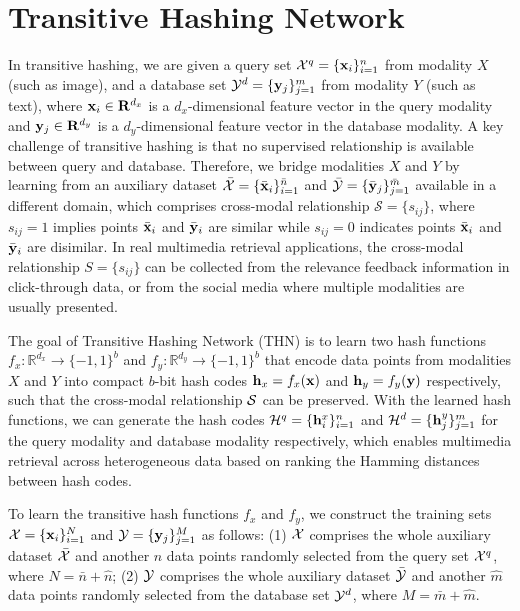 \documentclass{article}
\begin{document}
\section{Transitive Hashing Network}
In transitive hashing, we are given a query set ${\cal X}^q = \{ {\bf x}_i\}_{i=1}^n$ from modality $X$ (such as image), and a database set ${\cal Y}^d = \{ {\bf y}_j\}_{j=1}^m$ from modality $Y$ (such as text), where ${\bf x}_i \in \mathcal{\bf{R}}^{d_x}$ is a $d_x$-dimensional feature vector in the query modality and ${\bf y}_j \in \mathcal{\bf{R}}^{d_y}$ is a $d_y$-dimensional feature vector in the database modality. A key challenge of transitive hashing is that no supervised relationship  is available between query and database. Therefore, we bridge modalities $X$ and $Y$ by learning from an auxiliary dataset ${\cal\bar{X}} = \{ {\bar{\bf x}}_i\}_{i=1}^{\bar n}$ and ${\cal\bar{Y}} = \{ {\bar{\bf y}}_j\}_{j=1}^{\bar m}$ available in a different domain, which comprises cross-modal relationship $\mathcal{S} = \{ s_{ij}\}$, where $s_{ij} = 1$ implies points ${\bar{\bf x}}_i$ and ${\bar{\bf y}}_i$ are similar while $s_{ij} = 0$ indicates points ${\bar{\bf x}}_i$ and ${\bar{\bf y}}_i$ are disimilar. In real multimedia retrieval applications, the cross-modal relationship $S=\{s_{ij}\}$ can be collected from the relevance feedback information in click-through data, or from the social media where multiple modalities are usually presented.

The goal of Transitive Hashing Network (THN) is to learn two hash functions $f_x :\mathbb{R}^{d_x} \to \{ -1,1\}^b$ and $f_y :\mathbb{R}^{d_y} \to \{ -1,1 \}^b$ that encode data points from modalities $X$ and $Y$ into compact $b$-bit hash codes ${\bf h}_x = f_x({\bf x})$ and ${\bf h}_y = f_y({\bf y})$ respectively, such that the cross-modal relationship ${\cal S}$ can be preserved. With the learned hash functions, we can generate the hash codes ${\cal H}^q=\{{\bf h}_i^x\}_{i=1}^n$ and ${\cal H}^d=\{{\bf h}_j^y\}_{j=1}^m$ for the query modality and database modality respectively, which enables multimedia retrieval across heterogeneous data based on ranking the Hamming distances between hash codes.

To learn the transitive hash functions $f_x$ and $f_y$, we construct the training sets ${\cal X}=\{{\bf x}_i\}_{i=1}^{N}$ and ${\cal Y}=\{{\bf y}_j\}_{j=1}^{M}$ as follows: (1) ${\cal X}$ comprises the whole auxiliary dataset ${\bar{\cal X}}$ and another ${\hat n}$ data points randomly selected from the query set ${\cal X}^q$, where $N = {\bar n} + {\hat n}$; (2) ${\cal Y}$ comprises the whole auxiliary dataset ${\bar{\cal Y}}$ and another ${\hat m}$ data points randomly selected from the database set ${\cal Y}^d$, where $M = {\bar m} + {\hat m}$.
\end{document}
